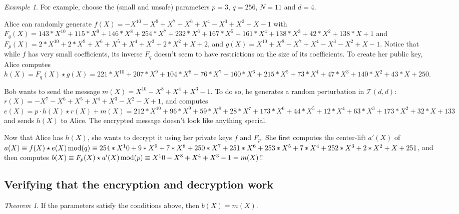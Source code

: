 \documentclass[12pt]{article}
\theoremstyle{definition}
\theoremstyle{proposition}
\theoremstyle{remark}
\theoremstyle{theorem}
\newtheorem{theorem}{Theorem}[section]
\theoremstyle{example}
\newtheorem{example}{Example}[section]
\begin{document}
\begin{example}
    For example, choose the (small and unsafe) parameters $p=3$, $q = 256$, $N = 11$ and $d = 4$. 
    
    Alice can randomly generate $f(X) = -X^10 - X^9 + X^7 + X^6 + X^4 - X^3 + X^2 + X - 1$ with $F_q(X) = 143*X^10 + 115*X^9 + 146*X^8 + 254*X^7 + 232*X^6 + 167*X^5 + 161*X^4 + 138*X^3 + 42*X^2 + 138*X + 1$ and $F_p(X) = 2*X^10 + 2*X^9 + X^6 + X^5 + X^4 + X^3 + 2*X^2 + X + 2$, and $g(X) = X^10 + X^8 - X^7 + X^4 - X^3 - X^2 + X - 1$. Notice that while $f$ has very small coefficients, its inverse $F_q$ doesn't seem to have restrictions on the size of its coefficients. To create her public key, Alice computes $h(X) = F_q(X) \star g(X) = 221*X^10 + 207*X^9 + 104*X^8 + 76*X^7 + 160*X^6 + 215*X^5 + 73*X^4 + 47*X^3 + 140*X^2 + 43*X + 250$.

    Bob wants to send the message $m(X) = X^10 - X^8 + X^4 + X^3 - 1$. To do so, he generates a random perturbation in $\mathcal{T}(d,d)$: $r(X) = -X^7 - X^6 + X^5 + X^4 + X^3 - X^2 - X + 1$, and computes $e(X) = p\cdot h(X)\star r(X) + m(X) = 212*X^10 + 96*X^9 + 59*X^8 + 28*X^7 + 173*X^6 + 44*X^5 + 12*X^4 + 63*X^3 + 173*X^2 + 32*X + 133$ and sends $h(X)$ to Alice. The encrypted message doesn't look like anything special.

    Now that Alice has $h(X)$, she wants to decrypt it using her private keys $f$ and $F_p$. She first computes the center-lift $a'(X)$ of $a(X) \equiv f(X) \star e(X) \thinspace \mathrm{mod}(q) \equiv 254*X^10 + 9*X^9 + 7*X^8 + 250*X^7 + 251*X^6 + 253*X^5 + 7*X^4 + 252*X^3 + 2*X^2 + X + 251$, and then computes $b(X) \equiv F_p(X) \star a'(X) \thinspace \mathrm{mod}(p) \equiv X^10 - X^8 + X^4 + X^3 - 1 = m(X)$!!

    
\end{example}

\subsection{Verifying that the encryption and decryption work}
\begin{theorem}
    If the parameters satisfy the conditions above, then $b(X) = m(X)$.
\end{theorem}
\end{document}
